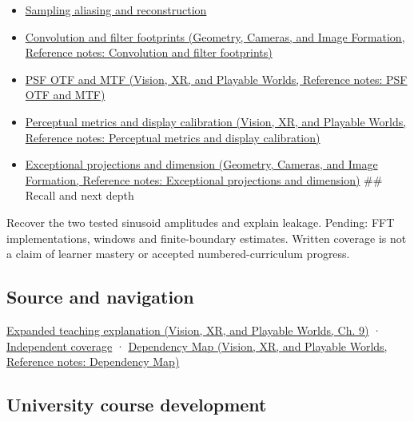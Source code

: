 \begin{itemize}
\item
  \hyperref[appendix-6a7869dd79a6]{Sampling aliasing and reconstruction}
\item
  \href{../03-Geometry-Cameras-and-Image-Formation/main.pdf\#nameddest=appendix-d5b3c692d9f0}{Convolution and filter footprints (Geometry, Cameras, and Image Formation, Reference notes: Convolution and filter footprints)}
\item
  \href{../07-Vision-XR-and-Playable-Worlds/main.pdf\#nameddest=appendix-8b76b0efd27f}{PSF OTF and MTF (Vision, XR, and Playable Worlds, Reference notes: PSF OTF and MTF)}
\item
  \href{../07-Vision-XR-and-Playable-Worlds/main.pdf\#nameddest=appendix-b2c1846508bf}{Perceptual metrics and display calibration (Vision, XR, and Playable Worlds, Reference notes: Perceptual metrics and display calibration)}
\item
  \href{../03-Geometry-Cameras-and-Image-Formation/main.pdf\#nameddest=appendix-3c73f7862157}{Exceptional projections and dimension (Geometry, Cameras, and Image Formation, Reference notes: Exceptional projections and dimension)} \#\# Recall and next depth
\end{itemize}

Recover the two tested sinusoid amplitudes and explain leakage. Pending: FFT implementations, windows and finite-boundary estimates. Written coverage is not a claim of learner mastery or accepted numbered-curriculum progress.

\subsection{Source and navigation}\label{appendix-b60686ba06a1-source-and-navigation}

\href{../07-Vision-XR-and-Playable-Worlds/main.pdf\#nameddest=04-visual-computing-ii-ch042-fourier-coordinates-reveal-what-a-filter-removes}{Expanded teaching explanation (Vision, XR, and Playable Worlds, Ch. 9)} · \hyperref[appendix-fd090d982a15-xr01---independent-seeing-and-representation-source]{Independent coverage} · \href{../07-Vision-XR-and-Playable-Worlds/main.pdf\#nameddest=appendix-4ad47bdd269a}{Dependency Map (Vision, XR, and Playable Worlds, Reference notes: Dependency Map)}

\subsection{University course development}\label{appendix-b60686ba06a1-university-course-development}

